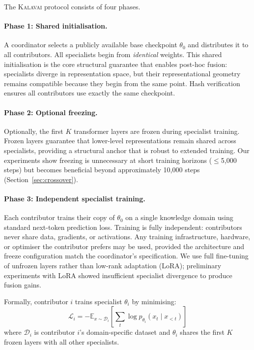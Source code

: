 \documentclass{article}
\newcommand{\kalavai}{\textsc{Kalavai}\xspace}
\begin{document}
The \kalavai protocol consists of four phases.

\paragraph{Phase 1: Shared initialisation.} A coordinator selects a publicly available base checkpoint $\theta_0$ and distributes it to all contributors. All specialists begin from \emph{identical} weights. This shared initialisation is the core structural guarantee that enables post-hoc fusion: specialists diverge in representation space, but their representational geometry remains compatible because they begin from the same point. Hash verification ensures all contributors use exactly the same checkpoint.

\paragraph{Phase 2: Optional freezing.} Optionally, the first $K$ transformer layers are frozen during specialist training. Frozen layers guarantee that lower-level representations remain shared across specialists, providing a structural anchor that is robust to extended training. Our experiments show freezing is unnecessary at short training horizons ($\leq$5,000 steps) but becomes beneficial beyond approximately 10,000 steps (Section~\ref{sec:crossover}).

\paragraph{Phase 3: Independent specialist training.} Each contributor trains their copy of $\theta_0$ on a single knowledge domain using standard next-token prediction loss. Training is fully independent: contributors never share data, gradients, or activations. Any training infrastructure, hardware, or optimiser the contributor prefers may be used, provided the architecture and freeze configuration match the coordinator's specification. We use full fine-tuning of unfrozen layers rather than low-rank adaptation (LoRA); preliminary experiments with LoRA showed insufficient specialist divergence to produce fusion gains.

Formally, contributor $i$ trains specialist $\theta_i$ by minimising:
\[
\mathcal{L}_i = -\mathbb{E}_{x \sim \mathcal{D}_i} \left[\sum_t \log p_{\theta_i}(x_t \mid x_{<t})\right]
\]
where $\mathcal{D}_i$ is contributor $i$'s domain-specific dataset and $\theta_i$ shares the first $K$ frozen layers with all other specialists.
\end{document}
